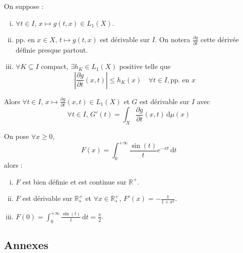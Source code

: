 	\begin{theorem}
		On suppose :
		\begin{enumerate}[(i)]
			\item $\forall t \in I$, $x \mapsto g(t,x) \in L_1(X)$.
			\item pp. en $x \in X$, $t \mapsto g(t,x)$ est dérivable sur $I$. On notera $\frac{\partial g}{\partial t}$ cette dérivée définie presque partout.
			\item $\forall K \subseteq I$ compact, $\exists h_K \in L_1(X)$ positive telle que
			\[ \left| \frac{\partial g}{\partial t}(x,t) \right| \leq h_K(x) \quad \forall t \in I, \text{pp. en } x \]
		\end{enumerate}
		Alors $\forall t \in I$, $x \mapsto \frac{\partial g}{\partial t}(x, t) \in L_1(X)$ et $G$ est dérivable sur $I$ avec
		\[ \forall t \in I, \, G'(t) = \int_X \frac{\partial g}{\partial t}(x, t) \, \mathrm{d}\mu(x) \]
	\end{theorem}
	
	
	\begin{application}
		On pose $\forall x \geq 0$,
		\[ F(x) = \int_0^{+\infty} \frac{\sin(t)}{t} e^{-xt} \, \mathrm{d}t \]
		alors :
		\begin{enumerate}[(i)]
			\item $F$ est bien définie et est continue sur $\mathbb{R}^+$.
			\item $F$ est dérivable sur $\mathbb{R}^+_*$ et $\forall x \in \mathbb{R}^+_*$, $F'(x) = -\frac{1}{1+x^2}$.
			\item $F(0) = \int_0^{+\infty} \frac{\sin(t)}{t} \, \mathrm{d}t = \frac{\pi}{2}$.
		\end{enumerate}
	\end{application}
	
	\subsection*{Annexes}
	
	
